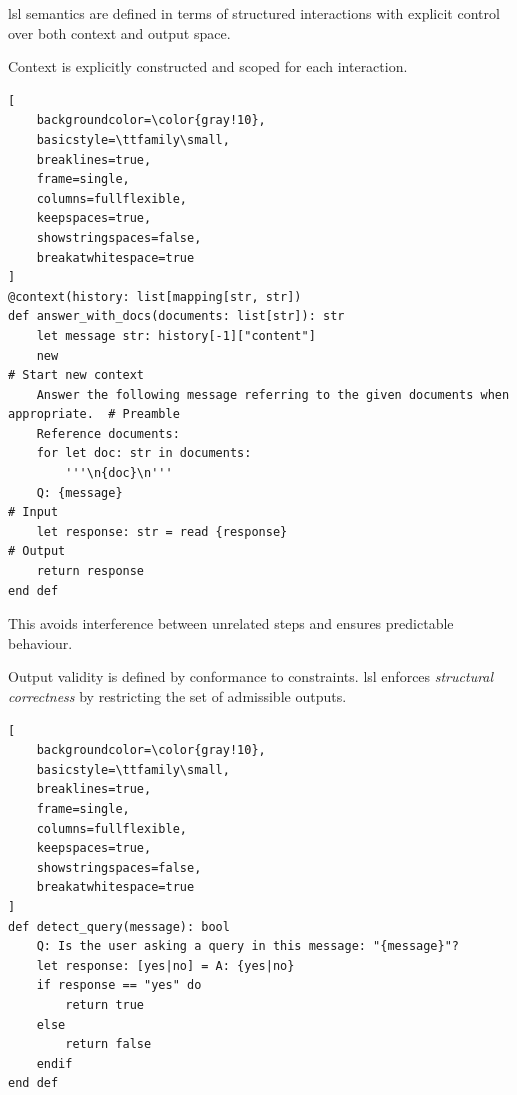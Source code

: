 \documentclass[manuscript,screen]{acmart}
\begin{document}

\ac{lsl} semantics are defined in terms of structured interactions with explicit control over both context and output space.

Context is explicitly constructed and scoped for each interaction.

\begin{lstlisting}[
    backgroundcolor=\color{gray!10},
    basicstyle=\ttfamily\small,
    breaklines=true,
    frame=single,
    columns=fullflexible,
    keepspaces=true,
    showstringspaces=false,
    breakatwhitespace=true
]
@context(history: list[mapping[str, str])
def answer_with_docs(documents: list[str]): str
    let message str: history[-1]["content"]
    new                                                                              # Start new context
    Answer the following message referring to the given documents when appropriate.  # Preamble
    Reference documents:
    for let doc: str in documents:
        '''\n{doc}\n'''
    Q: {message}                                                                     # Input
    let response: str = read {response}                                              # Output
    return response
end def
\end{lstlisting}

This avoids interference between unrelated steps and ensures predictable behaviour.

Output validity is defined by conformance to constraints. 
\ac{lsl} enforces \emph{structural correctness} by restricting the set of admissible outputs.

\begin{lstlisting}[
    backgroundcolor=\color{gray!10},
    basicstyle=\ttfamily\small,
    breaklines=true,
    frame=single,
    columns=fullflexible,
    keepspaces=true,
    showstringspaces=false,
    breakatwhitespace=true
]
def detect_query(message): bool
    Q: Is the user asking a query in this message: "{message}"?
    let response: [yes|no] = A: {yes|no}
    if response == "yes" do
        return true
    else
        return false
    endif
end def
\end{lstlisting}
\end{document}
